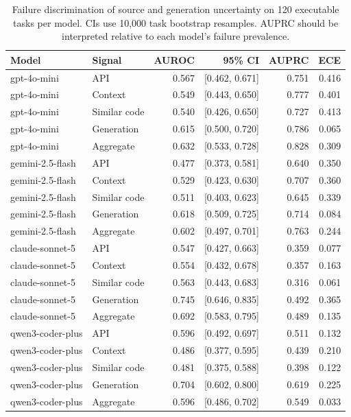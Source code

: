 \begin{table}[t]
\centering
\small
\caption{Failure discrimination of source and generation uncertainty on 120 executable tasks per model. CIs use 10,000 task bootstrap resamples. AUPRC should be interpreted relative to each model's failure prevalence.}
\label{tab:uncertainty_signal_transfer}
\begin{tabular}{llrrrr}
\toprule
Model & Signal & AUROC & 95\% CI & AUPRC & ECE \\
\midrule
gpt-4o-mini & API & 0.567 & [0.462, 0.671] & 0.751 & 0.416 \\
gpt-4o-mini & Context & 0.549 & [0.443, 0.650] & 0.777 & 0.401 \\
gpt-4o-mini & Similar code & 0.540 & [0.426, 0.650] & 0.727 & 0.413 \\
gpt-4o-mini & Generation & 0.615 & [0.500, 0.720] & 0.786 & 0.065 \\
gpt-4o-mini & Aggregate & 0.632 & [0.533, 0.728] & 0.828 & 0.309 \\
\midrule
gemini-2.5-flash & API & 0.477 & [0.373, 0.581] & 0.640 & 0.350 \\
gemini-2.5-flash & Context & 0.529 & [0.423, 0.630] & 0.707 & 0.360 \\
gemini-2.5-flash & Similar code & 0.511 & [0.403, 0.623] & 0.645 & 0.339 \\
gemini-2.5-flash & Generation & 0.618 & [0.509, 0.725] & 0.714 & 0.084 \\
gemini-2.5-flash & Aggregate & 0.602 & [0.497, 0.701] & 0.763 & 0.244 \\
\midrule
claude-sonnet-5 & API & 0.547 & [0.427, 0.663] & 0.359 & 0.077 \\
claude-sonnet-5 & Context & 0.554 & [0.432, 0.678] & 0.357 & 0.163 \\
claude-sonnet-5 & Similar code & 0.563 & [0.443, 0.683] & 0.316 & 0.061 \\
claude-sonnet-5 & Generation & 0.745 & [0.646, 0.835] & 0.492 & 0.365 \\
claude-sonnet-5 & Aggregate & 0.692 & [0.583, 0.795] & 0.489 & 0.135 \\
\midrule
qwen3-coder-plus & API & 0.596 & [0.492, 0.697] & 0.511 & 0.132 \\
qwen3-coder-plus & Context & 0.486 & [0.377, 0.595] & 0.439 & 0.210 \\
qwen3-coder-plus & Similar code & 0.481 & [0.375, 0.588] & 0.398 & 0.122 \\
qwen3-coder-plus & Generation & 0.704 & [0.602, 0.800] & 0.619 & 0.225 \\
qwen3-coder-plus & Aggregate & 0.596 & [0.486, 0.702] & 0.549 & 0.033 \\
\bottomrule
\end{tabular}
\end{table}
